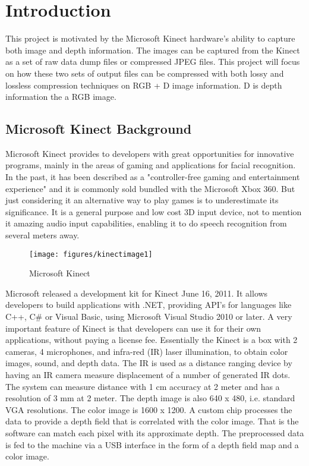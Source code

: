 \section{Introduction} \label{sec:intro}

This project is motivated by the Microsoft Kinect \cite{kinect} hardware's ability to capture both image and depth information. 
The images can be captured from the Kinect as a set of raw data dump files or compressed JPEG files. 
This project will focus on how these two sets of output files can be compressed with both lossy and lossless compression techniques on RGB + D image information. D is depth information the a RGB image.

\subsection{Microsoft Kinect Background}

Microsoft Kinect provides to developers with great opportunities for innovative programs, mainly in the areas of gaming and applications for facial recognition.
In the past, it has been described as a "controller-free gaming and entertainment experience" and it is commonly sold bundled with the Microsoft Xbox 360. But just considering it an alternative way to play games is to underestimate its significance. It is a general purpose and low cost 3D input device, not to mention it amazing audio input 
capabilities, enabling it to do speech recognition from several meters away.

\begin{figure}[hbt]
  \center
        \texttt{[image: figures/kinectimage1]}
        \caption{Microsoft Kinect}
  \label{fig:kinect}
\end{figure}

Microsoft released a development kit for Kinect June 16, 2011.
It allows developers to build applications with .NET, providing API's for languages like C++, C\# or Visual Basic, using Microsoft Visual Studio 2010 or later. 
A very important feature of Kinect is that developers can use it for their own applications, without paying a license fee.
Essentially the Kinect is a box with 2 cameras, 4 microphones, and infra-red (IR) laser illumination, to obtain color images, sound, and depth data. 
The IR is used as a distance ranging device by having an IR camera measure displacement of a number of generated IR dots. 
The system can measure distance with 1 cm accuracy at 2 meter and has a resolution of 3 mm at 2 meter. 
The depth image is also 640 x 480, i.e. standard VGA resolutions. 
The color image is 1600 x 1200. 
A custom chip processes the data to provide a depth field that is correlated with the color image. 
That is the software can match each pixel with its approximate depth. The preprocessed data is fed to the machine via a USB interface in the form of a depth field map and a color image.

